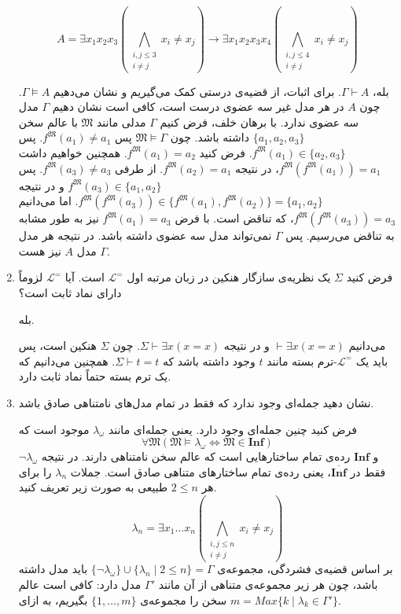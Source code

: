 \documentclass[12pt, 14paper]{article}
\begin{document}
\begin{enumerate}
\begin{ans}
    $$A = \exists x_1 x_2 x_3 (\bigwedge_{\substack{i,j \leq 3 \\ i \neq j}} x_i \neq x_j) \rightarrow \exists x_1 x_2 x_3 x_4 (\bigwedge_{\substack{i,j \leq 4 \\ i \neq j}} x_i \neq x_j)$$

    بله، $\Gamma \vdash A$. برای اثبات، از قضیه‌ی درستی کمک می‌گیریم و نشان می‌دهیم $\Gamma \vDash A$. چون $A$ در هر مدل غیر سه عضوی درست است، کافی است نشان دهیم $\Gamma$ مدل سه عضوی ندارد. با برهان خلف، فرض کنیم $\Gamma$ مدلی مانند $\mathfrak{M}$ با عالم سخن $\{ a_1, a_2, a_3 \}$ داشته باشد. چون $\mathfrak{M} \vDash \Gamma$ پس $f^\mathfrak{M}(a_1) \neq a_1$. پس $f^\mathfrak{M}(a_1) \in \{ a_2, a_3 \}$. فرض کنید $f^\mathfrak{M}(a_1) = a_2$. همچنین خواهیم داشت $f^\mathfrak{M}(f^\mathfrak{M}(a_1)) = a_1$، در نتیجه $f^\mathfrak{M}(a_2) = a_1$. از طرفی $f^\mathfrak{M}(a_3) \neq a_3$. پس $f^\mathfrak{M}(a_3) \in \{ a_1, a_2 \}$ و در نتیجه $f^\mathfrak{M}(f^\mathfrak{M}(a_3)) \in \{ f^\mathfrak{M}(a_1), f^\mathfrak{M}(a_2) \} = \{ a_1, a_2 \}$. اما می‌دانیم $f^\mathfrak{M}(f^\mathfrak{M}(a_3)) = a_3$، که تناقض است. با فرض $f^\mathfrak{M}(a_1) = a_3$ نیز به طور مشابه به تناقض می‌رسیم. پس $\Gamma$ نمی‌تواند مدل سه عضوی داشته باشد. در نتیجه هر مدل $\Gamma$ مدل $A$ نیز هست.
\end{ans}

\item فرض کنید $\Sigma$ یک نظریه‌ی سازگار هنکین در زبان مرتبه اول $\mathcal{L}^=$ است. آیا $\mathcal{L}^=$ لزوماً دارای نماد ثابت است؟
\begin{ans}
  بله.
  
  می‌دانیم $\vdash \exists x (x = x)$ و در نتیجه $\Sigma \vdash \exists x (x = x)$. چون $\Sigma$ هنکین است، پس باید یک $\mathcal{L}^=$-ترم بسته مانند $t$ وجود داشته باشد که $\Sigma \vdash t = t$. همچنین می‌دانیم که یک ترم بسته حتماً نماد ثابت دارد.
\end{ans}

\item نشان دهید جمله‌ای وجود ندارد که فقط در تمام مدل‌های نامتناهی صادق باشد.
\begin{ans}
  فرض کنید چنین جمله‌ای وجود دارد. یعنی جمله‌ای مانند $\lambda_\omega$ موجود است که
  $$ \forall \mathfrak{M} (\mathfrak{M} \vDash \lambda_\omega \iff \mathfrak{M} \in \mathbf{Inf}) $$
  و $\mathbf{Inf}$ رده‌ی تمام ساختارهایی است که عالم سخن نامتناهی دارند. در نتیجه $\neg \lambda_\omega$ فقط در $\overline{\mathbf
  {Inf}}$، یعنی رده‌ی تمام ساختارهای متناهی صادق است.
  جملات $\lambda_n$ را برای هر $2 \leq n$ طبیعی به صورت زیر تعریف کنید.
  $$ \lambda_n = \exists x_1 \dots x_n (\bigwedge_{\substack{i,j \leq n \\ i \neq j}} x_i \neq x_j)  $$
  بر اساس قضیه‌ی فشردگی، مجموعه‌ی $\{ \neg \lambda_\omega \} \cup \{ \lambda_n \mid 2 \leq n \} = \Gamma$ باید مدل داشته باشد، چون هر زیر مجموعه‌ی متناهی از آن مانند $\Gamma'$ مدل دارد: کافی است عالم سخن را مجموعه‌ی $\{ 1, \dots, m \}$ بگیریم، به ازای $m = Max\{ k \mid \lambda_k \in \Gamma' \}$.


\end{ans}
\end{enumerate}
\end{document}
